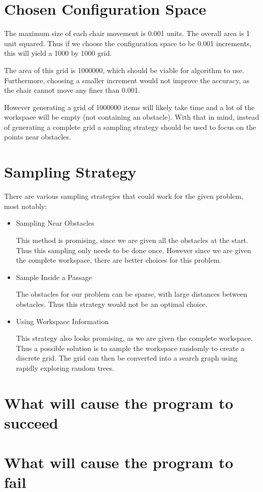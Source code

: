 \documentclass[12pt]{article}
\begin{document}
    \maketitle

    \section{Chosen Configuration Space}

    The maximum size of each chair movement is 0.001 units. The overall area is 1 unit squared. Thus if we choose the configuration space to be 0.001 increments, this will yield a 1000 by 1000 grid. 
    
    The area of this grid is 1000000, which should be viable for algorithm to use. Furthermore, choosing a smaller increment would not improve the accuracy, as the chair cannot move any finer than 0.001.
    
    However generating a grid of 1000000 items will likely take time and a lot of the workspace will be empty (not containing an obstacle). With that in mind, instead of generating a complete grid a sampling strategy should be used to focus on the points near obstacles.


    \section{Sampling Strategy}

    There are various sampling strategies that could work for the given problem, most notably:

    \begin{itemize}
        \item Sampling Near Obstacles
        
            This method is promising, since we are given all the obstacles at the start. Thus this sampling only needs to be done once. However since we are given the complete workspace, there are better choices for this problem.

        \item Sample Inside a Passage

            The obstacles for our problem can be sparse, with large distances between obstacles. Thus this strategy would not be an optimal choice.

        \item Using Workspace Information

            This strategy also looks promising, as we are given the complete workspace. Thus a possible solution is to sample the workspace randomly to create a discrete grid. The grid can then be converted into a search graph using rapidly exploring random trees.
    \end{itemize}

    \section{What will cause the program to succeed}

    \section{What will cause the program to fail}
\end{document}

